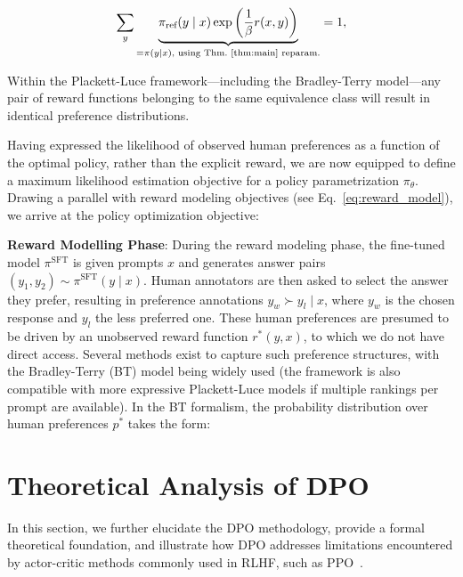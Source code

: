 \begin{equation}\label{eq:lag_p}
     \sum_{y}\underbrace{\pi_\text{ref}(y\mid x)\exp\left(\frac{1}{\beta}r(x, y)\right)}_{=\pi(y\mid x)\text{, using Thm.~\ref{thm:main} reparam.}} = 1,
\end{equation}

\begin{lemma}\label{lemma:same_prefrence}
Within the Plackett-Luce framework—including the Bradley-Terry model—any pair of reward functions belonging to the same equivalence class will result in identical preference distributions.
\end{lemma}

Having expressed the likelihood of observed human preferences as a function of the optimal policy, rather than the explicit reward, we are now equipped to define a maximum likelihood estimation objective for a policy parametrization $\pi_\theta$. Drawing a parallel with reward modeling objectives (see Eq.~\ref{eq:reward_model}), we arrive at the policy optimization objective:

\textbf{Reward Modelling Phase}: During the reward modeling phase, the fine-tuned model $\pi^\text{SFT}$ is given prompts $x$ and generates answer pairs $(y_1, y_2)\sim \pi^\text{SFT}(y \mid x)$. Human annotators are then asked to select the answer they prefer, resulting in preference annotations $y_w\succ y_l \mid x$, where $y_w$ is the chosen response and $y_l$ the less preferred one. These human preferences are presumed to be driven by an unobserved reward function $r^*(y, x)$, to which we do not have direct access. Several methods exist to capture such preference structures, with the Bradley-Terry (BT) model \cite{bradley1952rankanalysis} being widely used (the framework is also compatible with more expressive Plackett-Luce models \citep{plackett1975analysis, luce2012individual} if multiple rankings per prompt are available). In the BT formalism, the probability distribution over human preferences $p^*$ takes the form:

\section{Theoretical Analysis of DPO}
In this section, we further elucidate the DPO methodology, provide a formal theoretical foundation, and illustrate how DPO addresses limitations encountered by actor-critic methods commonly used in RLHF, such as PPO~\cite{schulman2017proximal}.

